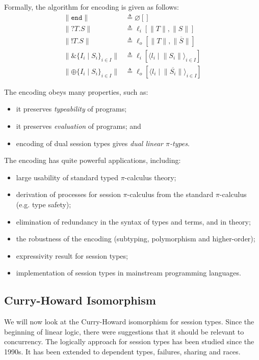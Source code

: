 \documentclass[a4paper, openany]{memoir}
\theoremstyle{definition}
\begin{document}
    Formally, the algorithm for encoding is given as follows:
    \begin{align*}
        \lVert \texttt{end} \rVert &\triangleq \varnothing[] \\
        \lVert ?T.S \rVert &\triangleq \ell_i[\lVert T \rVert, \lVert S\rVert] \\
        \lVert !T.S \rVert &\triangleq \ell_o[\lVert T\rVert, \lVert\overline{S}\rVert] \\
        \lVert \& \{I_i \mid S_i\}_{i \in I} \rVert &\triangleq \ell_i[\langle l_i \mid \lVert S_i \rVert \rangle_{i \in I}] \\
        \lVert \oplus \{I_i \mid S_i\}_{i \in I} \rVert &\triangleq \ell_o[\langle l_i \mid \lVert \overline{S_i}\rVert \rangle_{i \in I}]
    \end{align*}
    
    The encoding obeys many properties, such as:
    \begin{itemize}
        \item it preserves \emph{typeability} of programs;
        \item it preserves \emph{evaluation} of programs; and
        \item encoding of dual session types gives \emph{dual linear $\pi$-types}.
    \end{itemize}

    The encoding has quite powerful applications, including:
    \begin{itemize}
        \item large usability of standard typed $\pi$-calculus theory;
        \item derivation of processes for session $\pi$-calculus from the standard $\pi$-calculus (e.g. type safety);
        \item elimination of redundancy in the syntax of types and terms, and in theory;
        \item the robustness of the encoding (subtyping, polymorphism and higher-order);
        \item expressivity result for session types;
        \item implementation of session types in mainstream programming languages.
    \end{itemize}

    \subsection{Curry-Howard Isomorphism}
    We will now look at the Curry-Howard isomorphism for session types. Since the beginning of linear logic, there were suggestions that it should be relevant to concurrency. The logically approach for session types has been studied since the 1990s. It has been extended to dependent types, failures, sharing and races.
\end{document}
